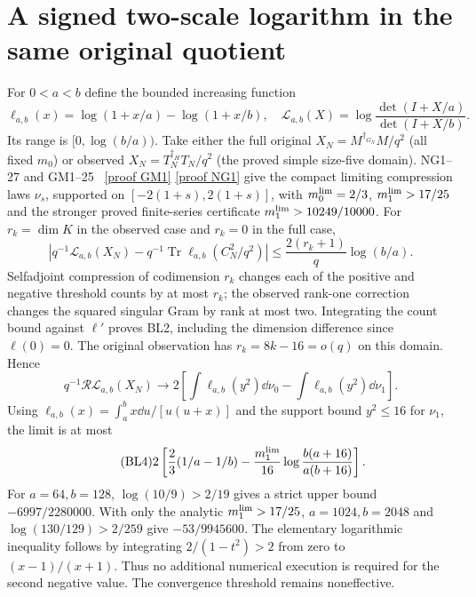\documentclass[11pt]{article}
\newcommand{\Tr}{\operatorname{Tr}}\newcommand{\diag}{\operatorname{diag}}
\begin{document}
\section{A signed two-scale logarithm in the same original quotient}
For $0<a<b$ define the bounded increasing function
\begin{equation}\tag{BL1}
 \ell_{a,b}(x)=\log(1+x/a)-\log(1+x/b),\quad
 \mathcal L_{a,b}(X)=\log\frac{\det(I+X/a)}{\det(I+X/b)}.
\end{equation}
Its range is $[0,\log(b/a))$. Take either the full original
$X_N=M^{\dagger_{G_N}}M/q^2$ (all fixed $m_0$) or observed
$X_N=T_N^{\dagger_H}T_N/q^2$ (the proved simple size-five domain).
NG1--27 and GM1--25 \cite{NG}%
~\href{https://github.com/KokunoYumeto/zeta-function-research-reader/blob/5992ad50c0f2a06921f1fcaded7b4e38097c0739/workbenches/splitzero-tandem/continuations/20260920-original-kernel-mixed-determinants/providers/GAUSSIAN_EQUILIBRIUM_MOMENTS.tex\#L22}{[proof GM1]} \href{https://github.com/KokunoYumeto/zeta-function-research-reader/blob/5992ad50c0f2a06921f1fcaded7b4e38097c0739/workbenches/splitzero-tandem/continuations/20260920-original-kernel-mixed-determinants/providers/GAUSSIAN_ARITHMETIC_RETURN.tex\#L31}{[proof NG1]}%
{} give the compact limiting compression
laws $\nu_s$, supported on $[-2(1+s),2(1+s)]$, with
$m_0^{\rm lim}=2/3$, $m_1^{\rm lim}>17/25$ and the stronger proved
finite-series certificate $m_1^{\rm lim}>10249/10000$.
For $r_k=\dim K$ in the observed case and $r_k=0$ in the full case,
\begin{equation}\tag{BL2}
 \left|q^{-1}\mathcal L_{a,b}(X_N)
 -q^{-1}\Tr\ell_{a,b}(C_N^2/q^2)\right|
 \le\frac{2(r_k+1)}q\log(b/a).
\end{equation}
Selfadjoint compression of codimension $r_k$ changes each of the
positive and negative threshold counts by at most $r_k$; the observed
rank-one correction changes the squared singular Gram by rank at most
two. Integrating the count bound against $\ell'$ proves BL2, including
the dimension difference since $\ell(0)=0$. The original observation
has $r_k=8k-16=o(q)$ on this domain. Hence
\begin{equation}\tag{BL3}
 q^{-1}\mathcal R\mathcal L_{a,b}(X_N)\longrightarrow
 2\left[\int\ell_{a,b}(y^2)\dd\nu_0
             -\int\ell_{a,b}(y^2)\dd\nu_1\right].
\end{equation}
Using $\ell_{a,b}(x)=\int_a^b x\dd u/[u(u+x)]$ and the support
bound $y^2\le16$ for $\nu_1$, the limit is at most
\begin{equation}\tag{BL4}
 2\left[\frac23(1/a-1/b)-\frac{m_1^{\rm lim}}{16}
                 \log\frac{b(a+16)}{a(b+16)}\right].
\end{equation}
For $a=64,b=128$, $\log(10/9)>2/19$ gives a strict upper bound
$-6997/2280000$. With only the analytic $m_1^{\rm lim}>17/25$,
$a=1024,b=2048$ and $\log(130/129)>2/259$ give
$-53/9945600$. The elementary logarithmic inequality follows by
integrating $2/(1-t^2)>2$ from zero to $(x-1)/(x+1)$.
Thus no additional numerical execution is required for the second
negative value. The convergence threshold remains noneffective.
\end{document}
